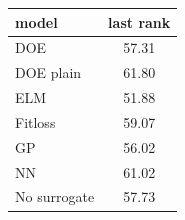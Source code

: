 \begin{tabular}{|lc|}
\hline
model & last rank\\
\hline
DOE & 57.31 \\
DOE plain & 61.80 \\
ELM & 51.88 \\
Fitloss & 59.07 \\
GP & 56.02 \\
NN & 61.02 \\
No surrogate & 57.73 \\
\hline
\end{tabular}
